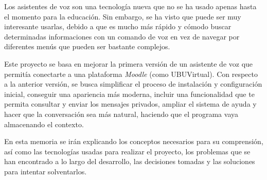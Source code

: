 
Los asistentes de voz son una tecnología nueva que no se ha usado apenas hasta el momento para la educación. Sin embargo, se ha visto que puede ser muy interesante usarlas, debido a que es mucho más rápido y cómodo buscar determinadas informaciones con un comando de voz en vez de navegar por diferentes menús que pueden ser bastante complejos.

Este proyecto se basa en mejorar la primera versión de un asistente de voz que permitía conectarte a una plataforma \textit{Moodle} (como UBUVirtual). Con respecto a la anterior versión, se busca simplificar el proceso de instalación y configuración inicial, conseguir una apariencia más moderna, incluir una funcionalidad que te permita consultar y enviar los mensajes privados, ampliar el sistema de ayuda y hacer que la conversación sea más natural, haciendo que el programa vaya almacenando el contexto.

En esta memoria se irán explicando los conceptos necesarios para su comprensión, así como las tecnologías usadas para realizar el proyecto, los problemas que se han encontrado a lo largo del desarrollo, las decisiones tomadas y las soluciones para intentar solventarlos.
